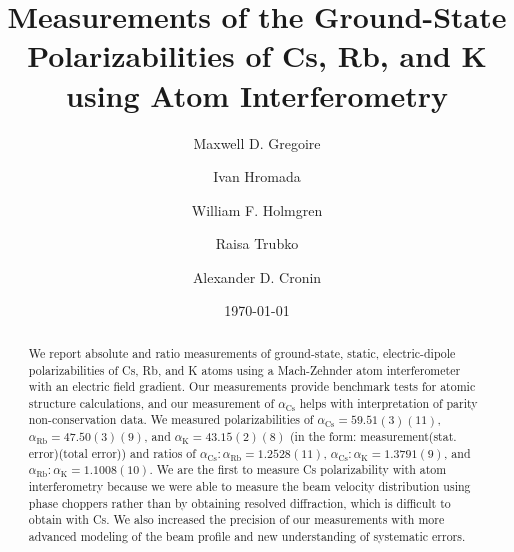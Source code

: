\documentclass[twocolumn, prl,showpacs,superscriptaddress]{revtex4-1}   %
\newcommand{\ak}{\alpha_{\textrm{K}}}
\newcommand{\arb}{\alpha_{\textrm{Rb}}}
\newcommand{\acs}{\alpha_{\textrm{Cs}}}
\newcommand{\polK}{43.15(2)(8)}
\newcommand{\polRb}{47.50(3)(9)}
\newcommand{\polCs}{59.51(3)(11)}
\newcommand{\ratRbK}{1.1008(10)}
\newcommand{\ratCsK}{1.3791(9)}
\newcommand{\ratCsRb}{1.2528(11)}
\begin{document}
\title{Measurements of the Ground-State Polarizabilities of Cs, Rb, and K using Atom Interferometry}

\author{Maxwell D. Gregoire}
\author{Ivan Hromada}
\author{William F. Holmgren}
\author{Raisa Trubko}
\author{Alexander D. Cronin}

\date{\today}





\begin{abstract}
We report absolute and ratio measurements of ground-state, static, electric-dipole polarizabilities of Cs, Rb, and K atoms using a Mach-Zehnder atom interferometer with an electric field gradient. Our measurements provide benchmark tests for atomic structure calculations, and our measurement of $\acs$ helps with interpretation of parity non-conservation data. We measured polarizabilities of $\acs = \polCs$, $\arb = \polRb$, and $\ak = \polK$ (in the form: measurement(stat. error)(total error)) and ratios of $\acs:\arb = \ratCsRb$, $\acs:\ak = \ratCsK$, and $\arb:\ak = \ratRbK$. We are the first to measure Cs polarizability with atom interferometry because we were able to measure the beam velocity distribution using phase choppers rather than by obtaining resolved diffraction, which is difficult to obtain with Cs. We also increased the precision of our measurements with more advanced modeling of the beam profile and new understanding of systematic errors.
\end{abstract}





\maketitle
\end{document}
